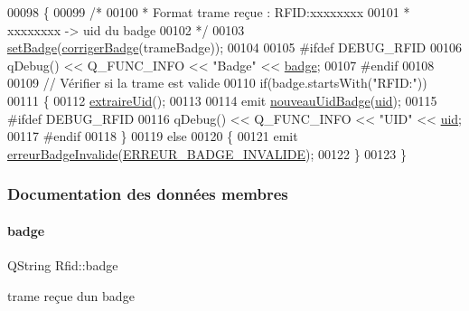 \begin{DoxyCode}
00098 \{
00099     \textcolor{comment}{/*}
00100 \textcolor{comment}{     * Format trame reçue : RFID:xxxxxxxx}
00101 \textcolor{comment}{     * xxxxxxxx -> uid du badge}
00102 \textcolor{comment}{     */}
00103     \hyperlink{class_rfid_a51021c0899dab1d5fb08e3dd6d93e425}{setBadge}(\hyperlink{class_rfid_afb99366646ac75b7e1d28302d38bf4f2}{corrigerBadge}(trameBadge));    
00104 
00105 \textcolor{preprocessor}{    #ifdef DEBUG\_RFID}
00106         qDebug() << Q\_FUNC\_INFO << \textcolor{stringliteral}{"Badge"} << \hyperlink{class_rfid_ac634cd26ffbe1c6da3967dc4af53b734}{badge};
00107 \textcolor{preprocessor}{    #endif}
00108 
00109     \textcolor{comment}{// Vérifier si la trame est valide}
00110     \textcolor{keywordflow}{if}(badge.startsWith(\textcolor{stringliteral}{"RFID:"}))
00111     \{
00112         \hyperlink{class_rfid_a884e849f175045d78587e1e09a87cb00}{extraireUid}();
00113 
00114         emit \hyperlink{class_rfid_a76990ba3147098e80ac6fc67af6439d1}{nouveauUidBadge}(\hyperlink{class_rfid_a157b71d282a7e067c65b431dbae6c6c8}{uid});
00115 \textcolor{preprocessor}{        #ifdef DEBUG\_RFID}
00116             qDebug() << Q\_FUNC\_INFO << \textcolor{stringliteral}{"UID"} << \hyperlink{class_rfid_a157b71d282a7e067c65b431dbae6c6c8}{uid};
00117 \textcolor{preprocessor}{        #endif}
00118     \}
00119     \textcolor{keywordflow}{else}
00120     \{
00121         emit \hyperlink{class_rfid_a896a20a2fbe2ac7d842456a1161717cb}{erreurBadgeInvalide}(\hyperlink{_rfid_8h_aad43c23a448ffc828e0b6014cfaf980a}{ERREUR\_BADGE\_INVALIDE});
00122     \}
00123 \}
\end{DoxyCode}


\subsubsection{Documentation des données membres}
\mbox{\label{class_rfid_ac634cd26ffbe1c6da3967dc4af53b734}} 
\paragraph{\texorpdfstring{badge}{badge}}
{\footnotesize\ttfamily Q\+String Rfid\+::badge\hspace{0.3cm}{\ttfamily [private]}}



trame reçue d\textquotesingle{}un badge 



